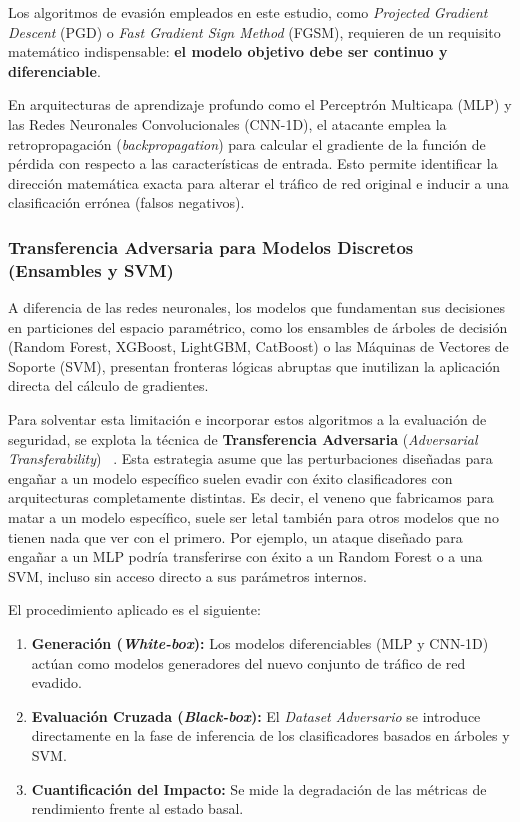 Los algoritmos de evasión empleados en este estudio, como \textit{Projected Gradient Descent} (PGD) o \textit{Fast Gradient Sign Method} (FGSM), requieren de un requisito matemático indispensable: \textbf{el modelo objetivo debe ser continuo y diferenciable}. 

En arquitecturas de aprendizaje profundo como el Perceptrón Multicapa (MLP) y las Redes Neuronales Convolucionales (CNN-1D), el atacante emplea la retropropagación (\textit{backpropagation}) para calcular el gradiente de la función de pérdida con respecto a las características de entrada. Esto permite identificar la dirección matemática exacta para alterar el tráfico de red original e inducir a una clasificación errónea (falsos negativos).

\subsubsection{Transferencia Adversaria para Modelos Discretos (Ensambles y SVM)}

A diferencia de las redes neuronales, los modelos que fundamentan sus decisiones en particiones del espacio paramétrico, como los ensambles de árboles de decisión (Random Forest, XGBoost, LightGBM, CatBoost) o las Máquinas de Vectores de Soporte (SVM), presentan fronteras lógicas abruptas que inutilizan la aplicación directa del cálculo de gradientes.

Para solventar esta limitación e incorporar estos algoritmos a la evaluación de seguridad, se explota la técnica de \textbf{Transferencia Adversaria} (\textit{Adversarial Transferability}) ~\cite{transferencia_adversaria}. Esta estrategia asume que las perturbaciones diseñadas para engañar a un modelo específico suelen evadir con éxito clasificadores con arquitecturas completamente distintas. 
Es decir, el veneno que fabricamos para matar a un modelo específico, suele ser letal también para otros modelos que no tienen nada que ver con el primero. Por ejemplo, un ataque diseñado para engañar a un MLP podría transferirse con éxito a un Random Forest o a una SVM, incluso sin acceso directo a sus parámetros internos.

El procedimiento aplicado es el siguiente:

\begin{enumerate}
    \item \textbf{Generación (\textit{White-box}):} Los modelos diferenciables (MLP y CNN-1D) actúan como modelos generadores del nuevo conjunto de tráfico de red evadido.
    \item \textbf{Evaluación Cruzada (\textit{Black-box}):} El \textit{Dataset Adversario} se introduce directamente en la fase de inferencia de los clasificadores basados en árboles y SVM.
    \item \textbf{Cuantificación del Impacto:} Se mide la degradación de las métricas de rendimiento frente al estado basal.
\end{enumerate}


